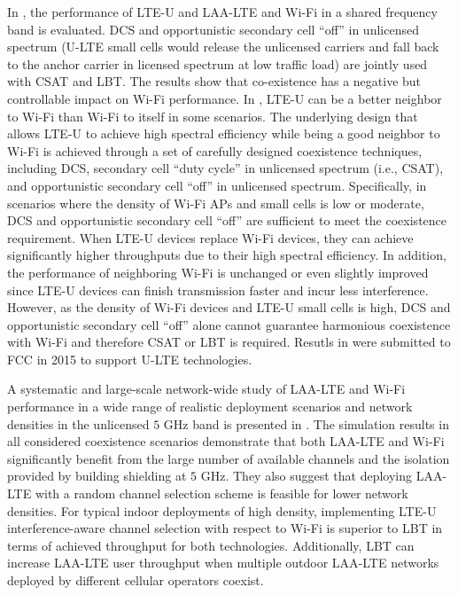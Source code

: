 \documentclass[journal,draftclsnofoot,12pt,onecolumn]{IEEEtran}
\begin{document}
In \cite{U-LTE-Wi-Fi-Qualcomm-2014, LTE-U-Wi-Fi-LTE-U-Forum-2015, LTE-U-Qualcomm-2015, U-LTE-Wi-Fi-Qualcomm-FCC-2015}, the performance of LTE-U and LAA-LTE and Wi-Fi in a shared frequency band is evaluated. DCS and opportunistic secondary cell ``off'' in unlicensed spectrum (U-LTE small cells would release the unlicensed carriers and fall back to the anchor carrier in licensed spectrum at low traffic load) are jointly used with CSAT and LBT. The results show that co-existence has a negative but controllable impact on Wi-Fi performance. In \cite{U-LTE-Wi-Fi-Qualcomm-2014, LTE-U-Wi-Fi-LTE-U-Forum-2015, LTE-U-Qualcomm-2015}, LTE-U can be a better neighbor to Wi-Fi than Wi-Fi to itself in some scenarios. The underlying design that allows LTE-U to achieve high spectral efficiency while being a good neighbor to Wi-Fi is achieved through a set of carefully designed coexistence techniques, including DCS, secondary cell ``duty cycle'' in unlicensed spectrum (i.e., CSAT), and opportunistic secondary cell ``off'' in unlicensed spectrum. Specifically, in scenarios where the density of Wi-Fi APs and small cells is low or moderate, DCS and opportunistic secondary cell ``off'' are sufficient to meet the coexistence requirement. When LTE-U devices replace Wi-Fi devices, they can achieve significantly higher throughputs due to their high spectral efficiency. In addition, the performance of neighboring Wi-Fi is unchanged or even slightly improved since LTE-U devices can finish transmission faster and incur less interference. However, as the density of Wi-Fi devices and LTE-U small cells is high, DCS and opportunistic secondary cell ``off'' alone cannot guarantee harmonious coexistence with Wi-Fi and therefore CSAT or LBT is required. Resutls in \cite{LTE-U-Wi-Fi-LTE-U-Forum-2015, U-LTE-Wi-Fi-Qualcomm-FCC-2015} were submitted to FCC in 2015 to support U-LTE technologies.

A systematic and large-scale network-wide study of LAA-LTE and Wi-Fi performance in a wide range of realistic deployment scenarios and network densities in the unlicensed $5$ GHz band is presented in \cite{LTE-U-ICC-WS-2015}. The simulation results in all considered coexistence scenarios demonstrate that both LAA-LTE and Wi-Fi significantly benefit from the large number of available channels and the isolation provided by building shielding at $5$ GHz. They also suggest that deploying LAA-LTE with a random channel selection scheme is feasible for lower network densities. For typical indoor deployments of high density, implementing LTE-U interference-aware channel selection with respect to Wi-Fi is superior to LBT in terms of achieved throughput for both technologies. Additionally, LBT can increase LAA-LTE user throughput when multiple outdoor LAA-LTE networks deployed by different cellular operators coexist.
\end{document}
